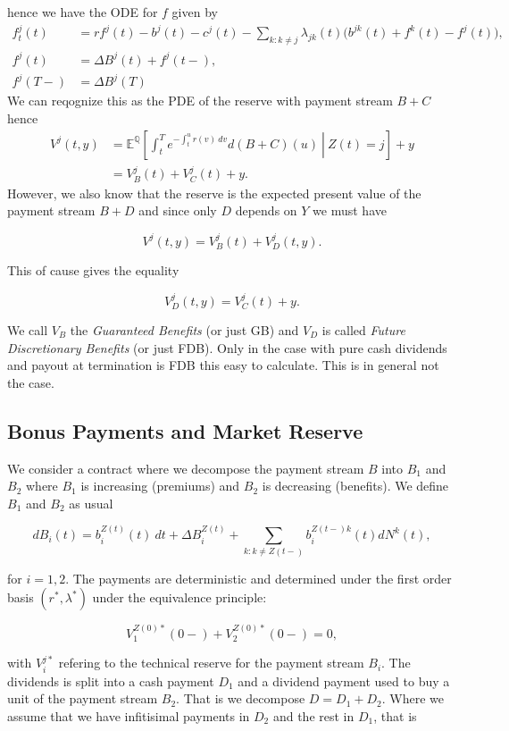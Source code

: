\documentclass[a4paper,12pt,openany]{book}
\begin{document}
hence we have the ODE for \(f\) given by
\begin{align*}
f_t^j(t)&=rf^j(t)-b^j(t)-c^j(t)-\sum_{k:k\ne j}\lambda_{jk}(t)\Big(b^{jk}(t)+f^k(t)-f^j(t)\Big),\\
f^j(t)&=\Delta B^j(t)+f^j(t-),\\
f^j(T-)&=\Delta B^j(T)
\end{align*}
We can reqognize this as the PDE of the reserve with payment stream \(B+C\) hence
\begin{align*}
V^j(t,y)&=\mathbb E^{\mathbb Q}\left[\left.\int_t^Te^{-\int_t^u r(v)\ dv}d(B+C)(u)\ \right\vert\ Z(t)=j\right]+y\\
&=V_B^j(t)+V_C^j(t)+y.
\end{align*}
However, we also know that the reserve is the expected present value of the payment stream \(B+D\) and since only \(D\) depends on \(Y\) we must have

\[
V^j(t,y)=V_B^j(t)+V_D^j(t,y).
\]

This of cause gives the equality

\[
V_D^j(t,y)=V_C^j(t)+y.
\]

We call \(V_B\) the \emph{Guaranteed Benefits} (or just GB) and \(V_D\) is called \emph{Future Discretionary Benefits} (or just FDB). Only in the case with pure cash dividends and payout at termination is FDB this easy to calculate. This is in general not the case.

\hypertarget{bonus-payments-and-market-reserve}{%
\subsection{Bonus Payments and Market Reserve}\label{bonus-payments-and-market-reserve}}

We consider a contract where we decompose the payment stream \(B\) into \(B_1\) and \(B_2\) where \(B_1\) is increasing (premiums) and \(B_2\) is decreasing (benefits). We define \(B_1\) and \(B_2\) as usual

\[
dB_i(t)=b_i^{Z(t)}(t)\ dt + \Delta B_i^{Z(t)}+\sum_{k:k\ne Z(t-)}b_i^{Z(t-)k}(t)dN^k(t),
\]

for \(i=1,2\). The payments are deterministic and determined under the first order basis \((r^*,\lambda^*)\) under the equivalence principle:

\[
V^{Z(0)*}_1(0-)+V_2^{Z(0)*}(0-)=0,
\]

with \(V_i^{j*}\) refering to the technical reserve for the payment stream \(B_i\). The dividends is split into a cash payment \(D_1\) and a dividend payment used to buy a unit of the payment stream \(B_2\). That is we decompose \(D=D_1+D_2\). Where we assume that we have infitisimal payments in \(D_2\) and the rest in \(D_1\), that is
\end{document}
